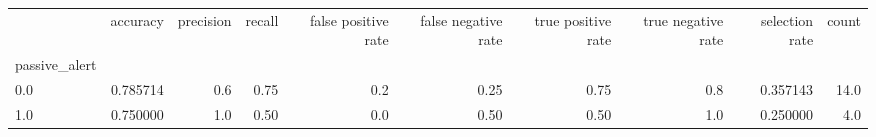 \begin{tabular}{lrrrrrrrrr}
\toprule
{} &  accuracy &  precision &  recall &  false positive rate &  false negative rate &  true positive rate &  true negative rate &  selection rate &  count \\
passive\_alert &           &            &         &                      &                      &                     &                     &                 &        \\
\midrule
0.0           &  0.785714 &        0.6 &    0.75 &                  0.2 &                 0.25 &                0.75 &                 0.8 &        0.357143 &   14.0 \\
1.0           &  0.750000 &        1.0 &    0.50 &                  0.0 &                 0.50 &                0.50 &                 1.0 &        0.250000 &    4.0 \\
\bottomrule
\end{tabular}
